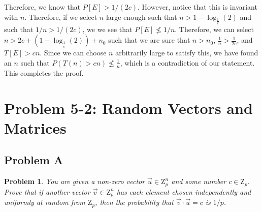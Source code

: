 \documentclass[psamsfonts]{amsart}
\newtheorem{prob}{Problem}[section]
\newenvironment{sol}{{\bfseries Solution}}{\qedsymbol}
\theoremstyle{definition}
\theoremstyle{remark}
\numberwithin{equation}{section}
\begin{document}
\begin{sol}
Therefore, we know that $P[E] > 1/(2c)$. However, notice that this is invariant with $n$. Therefore, if we select $n$ large enough such that $n > 1 - \log_{\frac{1}{c}}(2)$ and such that $1/n > 1/(2c)$, we we see that $P[E] \not \leq 1/n$. Therefore, we can select $n > 2c + (1 - \log_{\frac{1}{c}}(2)) + n_0$ such that we are sure that $n > n_0$, $\frac{1}{n} > \frac{1}{2c}$, and $T[E] > cn$. Since we can choose $n$ arbitrarily large to satisfy this, we have found an $n$ such that $P(T(n) > cn) \not \leq \frac{1}{n}$, which is a contradiction of our statement. This completes the proof.
\end{sol}

\section{Problem 5-2: Random Vectors and Matrices}

\subsection{Problem A}

\begin{prob}
You are given a non-zero vector $\vec{u} \in \mathrm{Z}_p^n$ and some number $c \in \mathrm{Z}_p$. Prove that if another vector $\vec{v} \in \mathrm{Z}_p^n$ has each element chosen independently and uniformly at random from $\mathrm{Z}_p$, then the probability that $\vec{v} \cdot \vec{u} = c $ is $1/p$. 
\end{prob}
\end{document}
